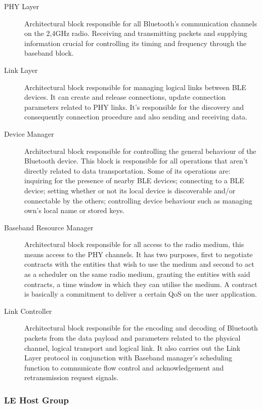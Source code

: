 \begin{description}

\item[\ac{PHY} Layer] Architectural block responsible for all Bluetooth’s communication channels on the 2,4GHz radio. Receiving and transmitting packets and supplying information crucial for controlling its timing and frequency through the baseband block.


\item[Link Layer] Architectural block responsible for managing logical links between \ac{BLE} devices. It can create and release connections, update connection parameters related to \ac{PHY} links. It's responsible for the discovery and consequently connection procedure and also sending and receiving data.


\item[Device Manager] Architectural block responsible for controlling the general behaviour of the Bluetooth device. This block is responsible for all operations that aren't directly related to data transportation. Some of its operations are: inquiring for the presence of nearby  \ac{BLE} devices; connecting to a \ac{BLE} device; setting whether or not its local device is discoverable and/or connectable by the others; controlling device behaviour such as managing own's local name or stored keys. 


\item[Baseband Resource Manager] Architectural block responsible for all access to the radio medium, this means access to the \ac{PHY} channels. It has two purposes, first to negotiate contracts with the entities that wish to use the medium and second to act as a scheduler on the same radio medium, granting the entities with said contracts, a time window in which they can utilise the medium. A contract is basically a commitment to deliver a certain \ac{QoS} on the user application.


\item[Link Controller] Architectural block responsible for the encoding and decoding of Bluetooth packets from the data payload and parameters related to the physical channel, logical transport and logical link. It also carries out the Link Layer protocol in conjunction with Baseband manager's scheduling function to communicate flow control and acknowledgement and retransmission request signals.

\end{description}


\subsubsection{ \ac{LE} Host Group}
\label{subsec:LEHost}

